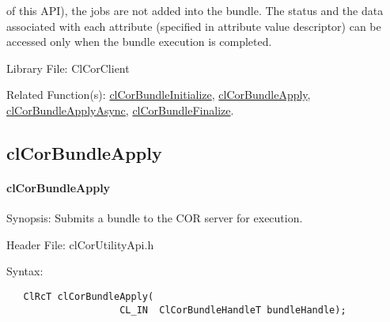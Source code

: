 \begin{flushleft}
\begin{Desc}
of this API), the jobs are not added into the bundle. The status and the data associated with each attribute (specified in attribute value 
descriptor) can be accessed only when the bundle execution is completed.
\end{Desc}
\begin{Desc}
\item[Library File:]Cl\-Cor\-Client\end{Desc}
\begin{Desc}
\item[Related Function(s):]\hyperlink{pagecor153}{clCorBundleInitialize}, \hyperlink{pagecor151}{clCorBundleApply},
\hyperlink{pagecor152}{clCorBundleApplyAsync}, \hyperlink{pagecor154}{clCorBundleFinalize}. 
\end{Desc}
\newpage



\subsection{clCorBundleApply}
\hypertarget{pagecor151}{}\paragraph{cl\-Cor\-Bundle\-Apply}\label{pagecor151}
\begin{Desc}
\item[Synopsis:] Submits a bundle to the COR server for execution.
\end{Desc}
\begin{Desc}
\item[Header File:]clCorUtilityApi.h\end{Desc}
\begin{Desc}
\item[Syntax:]

\footnotesize\begin{verbatim}   ClRcT clCorBundleApply( 
  					CL_IN  ClCorBundleHandleT bundleHandle);



\end{verbatim}
\end{Desc}
\end{flushleft}
